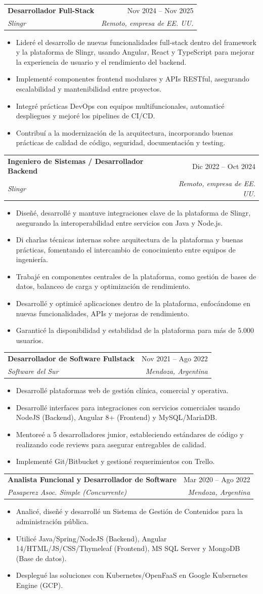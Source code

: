 \documentclass[letterpaper,11pt]{article}
\makeatletter
\newcommand{\resumeItem}[1]{
  \item\small{
    {#1 \vspace{-1pt}}
  }
}
\newcommand{\resumeSubheading}[4]{
  \needspace{4\baselineskip}\vspace{-1pt}\item
    \begin{tabular*}{0.97\textwidth}[t]{l@{\extracolsep{\fill}}r}
      \textbf{#1} & #2 \\
      \textit{\small#3} & \textit{\small #4} \\
    \end{tabular*}\vspace{-5pt}
}
\newcommand{\resumeItemListStart}{\begin{itemize}}
\newcommand{\resumeItemListEnd}{\end{itemize}\vspace{-3pt}}
\makeatother
\begin{document}
  \resumeSubheading
  {Desarrollador Full-Stack}{Nov 2024 -- Nov 2025}
  {Slingr}{Remoto, empresa de EE. UU.}
  \resumeItemListStart
    \resumeItem{Lideré el desarrollo de nuevas funcionalidades full-stack dentro del framework y la plataforma de Slingr, usando Angular, React y TypeScript para mejorar la experiencia de usuario y el rendimiento del backend.}
    \resumeItem{Implementé componentes frontend modulares y APIs RESTful, asegurando escalabilidad y mantenibilidad entre proyectos.}
    \resumeItem{Integré prácticas DevOps con equipos multifuncionales, automaticé despliegues y mejoré los pipelines de CI/CD.}
    \resumeItem{Contribuí a la modernización de la arquitectura, incorporando buenas prácticas de calidad de código, seguridad, documentación y testing.}
  \resumeItemListEnd

  \resumeSubheading
  {Ingeniero de Sistemas / Desarrollador Backend}{Dic 2022 -- Oct 2024}
  {Slingr}{Remoto, empresa de EE. UU.}
  \resumeItemListStart
    \resumeItem{Diseñé, desarrollé y mantuve integraciones clave de la plataforma de Slingr, asegurando la interoperabilidad entre servicios con Java y Node.js.}
    \resumeItem{Di charlas técnicas internas sobre arquitectura de la plataforma y buenas prácticas, fomentando el intercambio de conocimiento entre equipos de ingeniería.}
    \resumeItem{Trabajé en componentes centrales de la plataforma, como gestión de bases de datos, balanceo de carga y optimización de rendimiento.}
    \resumeItem{Desarrollé y optimicé aplicaciones dentro de la plataforma, enfocándome en nuevas funcionalidades, APIs y mejoras de rendimiento.}
    \resumeItem{Garanticé la disponibilidad y estabilidad de la plataforma para más de 5.000 usuarios.}
  \resumeItemListEnd

  \resumeSubheading
  {Desarrollador de Software Fullstack}{Nov 2021 -- Ago 2022}
  {Software del Sur}{Mendoza, Argentina}
  \resumeItemListStart
    \resumeItem{Desarrollé plataformas web de gestión clínica, comercial y operativa.}
    \resumeItem{Desarrollé interfaces para integraciones con servicios comerciales usando NodeJS (Backend), Angular 8+ (Frontend) y MySQL/MariaDB.}
    \resumeItem{Mentoreé a 5 desarrolladores junior, estableciendo estándares de código y realizando code reviews para asegurar entregables de calidad.}
    \resumeItem{Implementé Git/Bitbucket y gestioné requerimientos con Trello.}
  \resumeItemListEnd

  \resumeSubheading
  {Analista Funcional y Desarrollador de Software}{Mar 2020 -- Ago 2022}
  {Pasaperez Asoc. Simple (Concurrente)}{Mendoza, Argentina}
  \resumeItemListStart
    \resumeItem{Analicé, diseñé y desarrollé un Sistema de Gestión de Contenidos para la administración pública.}
    \resumeItem{Utilicé Java/Spring/NodeJS (Backend), Angular 14/HTML/JS/CSS/Thymeleaf (Frontend), MS SQL Server y MongoDB (Base de datos).}
    \resumeItem{Desplegué las soluciones con Kubernetes/OpenFaaS en Google Kubernetes Engine (GCP).}
  \resumeItemListEnd
\end{document}
